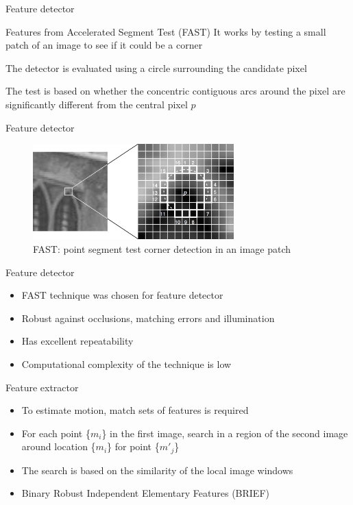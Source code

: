 \documentclass{beamer}
\begin{document}
\begin{frame}{Feature detector}
  \begin{block}{Features from Accelerated Segment Test (FAST)}
      It works by testing a small patch of an image to see if it could be a corner
  \end{block}
  \begin{block}{}
      The detector is evaluated using a circle surrounding the candidate pixel
  \end{block}
  \begin{block}{}
      The test is based on whether the concentric contiguous arcs around the pixel are significantly different from the central pixel $p$
  \end{block}
\end{frame}
\begin{frame}{Feature detector}
  \begin{figure}[!htb]
    \centering
    \includegraphics[width=220pt]{../chapters/tracking_library_for_the_web/fast.png}
    \caption{FAST: point segment test corner detection in an image patch}
    \label{figure:fast}
  \end{figure}
\end{frame}
\begin{frame}{Feature detector}
  \begin{itemize}
    \item FAST technique was chosen for feature detector
    \item Robust against occlusions, matching errors and illumination
    \item Has excellent repeatability
    \item Computational complexity of the technique is low
  \end{itemize}
\end{frame}
\begin{frame}{Feature extractor}
  \begin{itemize}
    \item To estimate motion, match sets of features is required
    \item For each point \{$m_{i}$\} in the first image, search in a region of the second image around location \{$m_{i}$\} for point \{$m'_{j}$\}
    \item The search is based on the similarity of the local image windows
    \item Binary Robust Independent Elementary Features (BRIEF)
  \end{itemize}
\end{frame}
\end{document}
